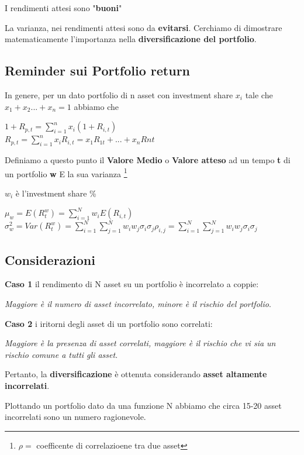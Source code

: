 \documentclass[a4paper,11pt]{report}
\begin{document}
{	I rendimenti attesi sono "\textbf{buoni}"

	La varianza, nei rendimenti attesi sono da \textbf{evitarsi}. \newline
	Cerchiamo di dimostrare matematicamente l'importanza nella \textbf{diversificazione del portfolio}. 
\subsection{Reminder sui Portfolio return}
	In genere, per un dato portfolio di n asset con investment share $x_i$ tale che $x_1+x_2...+x_n = 1$ abbiamo che
\begin{center}
	$1+R_{p,t} = \sum\limits_{i=1}^n x_i(1+R_{i,t}) $\\
	$R_{p,t} =  \sum\limits_{i=1}^n x_i R_{i,t}= x_1 R_{1t}+... + x_n R{nt}$
\end{center}

	Definiamo a questo punto il \textbf{Valore Medio} o \textbf{Valore atteso} ad un tempo \textbf{t} di un portfolio \textbf{w} E la sua varianza \footnote{ $\rho =$ coefficente di correlazioene tra due asset}

$w_i$ è l'investment share \%	
\begin{center}
	$\mu_w = E(R_t^w) =  \sum\limits_{i=1}^N w_i E(R_{i,t}) $ 
	$\sigma_w^2 = Var(R_t^w) =  \sum\limits_{i=1}^N  \sum\limits_{j=1}^N w_i w_j \sigma_i \sigma_j \rho_{i,j} =  \sum		\limits_{i=1}^N  \sum\limits_{j=1}^N w_i w_j \sigma_i \sigma_j  $ 
\end{center}
\subsection{Considerazioni}
	\textbf{Caso 1} il rendimento di N asset su un portfolio è incorrelato a coppie:

	\emph{Maggiore è il numero di asset incorrelato, minore è il rischio del portfolio}. 

	\textbf{Caso 2} i iritorni degli asset di un portfolio sono correlati: 

	\emph{Maggiore è la presenza di asset correlati, maggiore è il rischio che vi sia un rischio comune a tutti gli asset}. \newline

	Pertanto, la \textbf{diversificazione} è ottenuta considerando \textbf{asset altamente incorrelati}.

	Plottando un portfolio dato da una funzione N abbiamo che circa 15-20 asset incorrelati sono un numero ragionevole.

}
\end{document}
